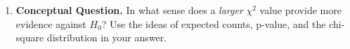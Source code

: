 \documentclass[10pt]{article}
\begin{document}
\begin{enumerate}[itemsep=10pt]
\vspace{0.1in}

\item \textbf{Conceptual Question.}
In what sense does a \emph{larger} $\chi^2$ value provide more evidence against $H_0$?
Use the ideas of expected counts, p-value, and the chi-square distribution in your answer.

\end{enumerate}
\end{document}
